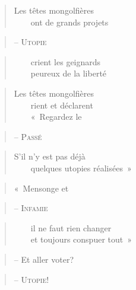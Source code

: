 \newpage

  \begin{verse}
    Les têtes mongolfières\\
    ~~~~ont de grands projets
  \end{verse}
  \begin{verse}
    -- \textsc{Utopie}
  \end{verse}
  \begin{verse}
    ~~~~crient les geignards\\
    ~~~~peureux de la liberté
  \end{verse}
  \begin{verse}
    Les têtes mongolfières\\
    ~~~~rient et déclarent\\
    ~~~~«~Regardez le
  \end{verse}
  \begin{verse}
    -- \textsc{Passé}
  \end{verse}
  \begin{verse}
    S’il n’y est pas déjà\\
    ~~~~quelques utopies réalisées~»
  \end{verse}
  \begin{verse}
    «~Mensonge et
  \end{verse}
  \begin{verse}
    -- \textsc{Infamie}
  \end{verse}
  \begin{verse}
    ~~~~il ne faut rien changer\\
    ~~~~et toujours conspuer tout~»
  \end{verse}
  \begin{verse}
    -- Et aller voter?
  \end{verse}
  \begin{verse}
    -- \textsc{Utopie}!
  \end{verse}

